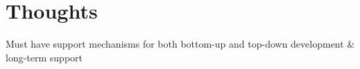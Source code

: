 \section{Thoughts}
Must have support mechanisms for both bottom-up and top-down development \& long-term support





 




% 

